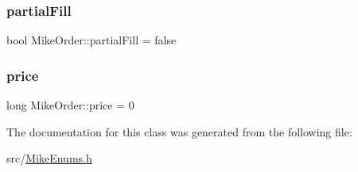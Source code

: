 \mbox{\label{class_mike_order_a998f64ee97190c0a9c8ca51d13210718}} 
\subsubsection{\texorpdfstring{partial\+Fill}{partialFill}}
{\footnotesize\ttfamily bool Mike\+Order\+::partial\+Fill = false}

\mbox{\label{class_mike_order_a20a48ccf6f6980182d5a2eee62c439aa}} 
\subsubsection{\texorpdfstring{price}{price}}
{\footnotesize\ttfamily long Mike\+Order\+::price = 0}



The documentation for this class was generated from the following file\+:\begin{DoxyCompactItemize}
\item 
src/\hyperlink{_mike_enums_8h}{Mike\+Enums.\+h}\end{DoxyCompactItemize}
